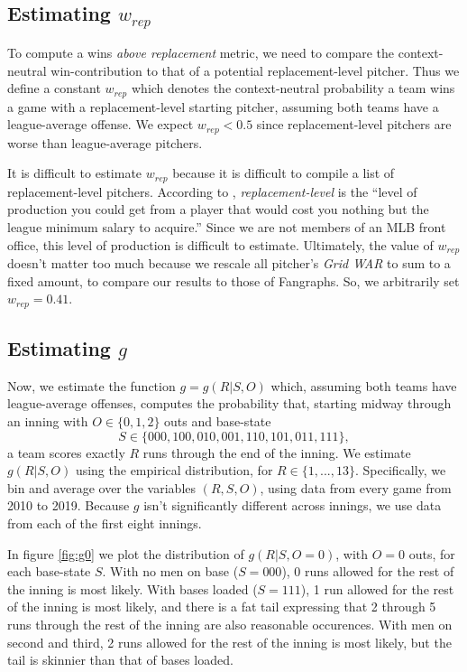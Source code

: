 \documentclass[12pt]{article}
\begin{document}
\subsection{Estimating $w_{rep}$}

To compute a wins \textit{above replacement} metric, we need to compare the context-neutral win-contribution to that of a potential replacement-level pitcher. Thus we define a constant $w_{rep}$ which denotes the context-neutral probability a team wins a game with a replacement-level starting pitcher, assuming both teams have a league-average offense. We expect $w_{rep} < 0.5$ since replacement-level pitchers are worse than league-average pitchers. 

It is difficult to estimate $w_{rep}$ because it is difficult to compile a list of replacement-level pitchers. According to \citet{ReplacementLevel}, \textit{replacement-level} is the ``level of production you could get from a player that would cost you nothing but the league minimum salary to acquire.'' Since we are not members of an MLB front office, this level of production is difficult to estimate. Ultimately, the value of $w_{rep}$ doesn't matter too much because we rescale all pitcher's \textit{Grid WAR} to sum to a fixed amount, to compare our results to those of Fangraphs. So, we arbitrarily set $w_{rep} = 0.41$. 

\subsection{Estimating $g$}

Now, we estimate the function $g=g(R|S,O)$ which, assuming both teams have league-average offenses, computes the probability that, starting midway through an inning with $O \in \{0,1,2\}$ outs and base-state 
$$S \in \{000,100,010,001,110,101,011,111\},$$
a team scores exactly $R$ runs through the end of the inning. We estimate $g(R|S,O)$ using the empirical distribution, for $R \in \{1,...,13\}$. Specifically, we bin and average over the variables $(R,S,O)$, using data from every game from 2010 to 2019. Because $g$ isn't significantly different across innings, we use data from each of the first eight innings.

In figure \ref{fig:g0} we plot the distribution of $g(R|S,O=0)$, with $O=0$ outs, for each base-state $S$. With no men on base ($S=000$), 0 runs allowed for the rest of the inning is most likely. With bases loaded ($S=111$), 1 run allowed for the rest of the inning is most likely, and there is a fat tail expressing that 2 through 5 runs through the rest of the inning are also reasonable occurences. With men on second and third, 2 runs allowed for the rest of the inning is most likely, but the tail is skinnier than that of bases loaded. 
\end{document}

